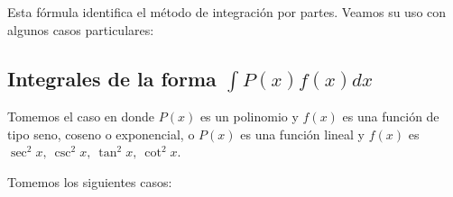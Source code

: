 Esta fórmula identifica el método de integración por partes. Veamos su uso con algunos casos particulares:

\subsection*{Integrales de la forma $\displaystyle\int P(x)f(x)dx$}\label{ProdFunciones}

Tomemos el caso en donde $P\left( x\right) $ es un polinomio y $f(x)$ es una función de tipo seno, coseno o exponencial, o $P(x)$ es una función lineal y $f(x)$ es $\sec ^{2}x,\ \csc^{2}x,\ \tan ^{2}x,\ \cot ^{2}x.$

\begin{ejemplo}
Tomemos los siguientes casos:
\end{ejemplo}

